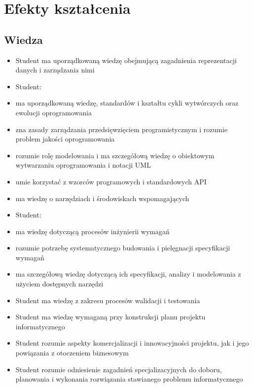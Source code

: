 \documentclass[12pt, a4paper]{article}
\begin{document}
\section{Efekty kształcenia}

\subsection*{Wiedza}
\begin{itemize}
  \item Student ma uporządkowaną wiedzę obejmującą zagadnienia reprezentacji danych i zarządzania nimi
  \item Student:
  \item ma uporządkowaną wiedzę, standardów i kształtu cykli wytwórczych oraz ewolucji oprogramowania
  \item zna zasady zarządzania przedsięwzięciem programistycznym i rozumie problem jakości oprogramowania
  \item rozumie rolę modelowania i ma szczegółową wiedzę o obiektowym wytwarzaniu oprogramowania i notacji UML
  \item umie korzystać z wzorców programowych i standardowych API
  \item ma wiedzę o narzędziach i środowiskach wspomagających
  \item Student:
  \item ma wiedzę dotyczącą procesów inżynierii wymagań
  \item rozumie potrzebę systematycznego budowania i pielęgnacji specyfikacji wymagań
  \item ma szczegółową wiedzę dotyczącą ich specyfikacji, analizy i modelowania z użyciem dostępnych narzędzi
  \item Student ma wiedzę z zakresu procesów walidacji i testowania
  \item Student ma wiedzę wymaganą przy konstrukcji planu projektu informatycznego
  \item Student rozumie aspekty komercjalizacji i innowacyjności projektu, jak i jego powiązania z otoczeniem biznesowym
  \item Student rozumie odniesienie zagadnień specjalizacyjnych do doboru, planowania i wykonania rozwiązania stawianego problemu informatycznego
\end{itemize}
\end{document}
